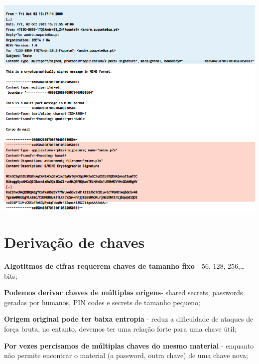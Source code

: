 \documentclass{article}
\begin{document}
\begin{center}
  \includegraphics[scale=0.5]{13}
\end{center}

\pagebreak

\section{Derivação de chaves}

\begin{flushleft}
  \textbf{Algotitmos de cifras requerem chaves de tamanho fixo} - 56, 128, 256,\dots bits;

  \vspace{2mm}

  \textbf{Podemos derivar chaves de múltiplas origens}- shared secrets, passwords
  geradas por humanos, PIN codes e secrets de tamanho pequeno;

  \vspace{2mm}

  \textbf{Origem original pode ter baixa entropia} - reduz a dificuldade de
  ataques de força bruta, no entanto, devemos ter uma relação forte
  para uma chave útil;

  \vspace{2mm}

  \textbf{Por vezes percisamos de múltiplas chaves do mesmo material} -
  enquanto não permite encontrar o material (a password, outra chave)
  de uma chave nova;
\end{flushleft}
\end{document}
